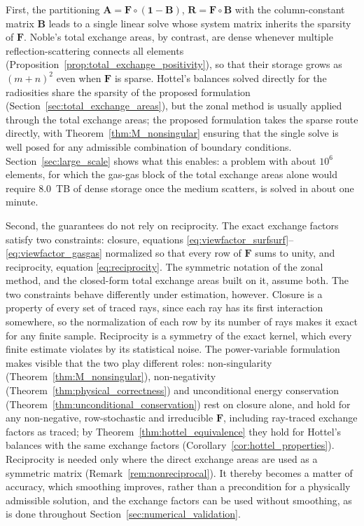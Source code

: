 \documentclass[preprint,1p,times]{elsarticle}
\theoremstyle{plain}
\theoremstyle{definition}
\theoremstyle{remark}
\begin{document}
First, the partitioning $\mathbf{A} = \mathbf{F}\circ(\mathbf{1}-\mathbf{B})$, $\mathbf{R} = \mathbf{F}\circ\mathbf{B}$ with the column-constant matrix $\mathbf{B}$ leads to a single linear solve whose system matrix inherits the sparsity of $\mathbf{F}$. Noble's total exchange areas, by contrast, are dense whenever multiple reflection-scattering connects all elements (Proposition~\ref{prop:total_exchange_positivity}), so that their storage grows as $(m+n)^2$ even when $\mathbf{F}$ is sparse. Hottel's balances solved directly for the radiosities share the sparsity of the proposed formulation (Section~\ref{sec:total_exchange_areas}), but the zonal method is usually applied through the total exchange areas; the proposed formulation takes the sparse route directly, with Theorem~\ref{thm:M_nonsingular} ensuring that the single solve is well posed for any admissible combination of boundary conditions. Section~\ref{sec:large_scale} shows what this enables: a problem with about $10^6$ elements, for which the gas-gas block of the total exchange areas alone would require 8.0~TB of dense storage once the medium scatters, is solved in about one minute.

Second, the guarantees do not rely on reciprocity. The exact exchange factors satisfy two constraints: closure, equations \eqref{eq:viewfactor_surfsurf}--\eqref{eq:viewfactor_gasgas} normalized so that every row of $\mathbf{F}$ sums to unity, and reciprocity, equation \eqref{eq:reciprocity}. The symmetric notation of the zonal method, and the closed-form total exchange areas built on it, assume both. The two constraints behave differently under estimation, however. Closure is a property of every set of traced rays, since each ray has its first interaction somewhere, so the normalization of each row by its number of rays makes it exact for any finite sample. Reciprocity is a symmetry of the exact kernel, which every finite estimate violates by its statistical noise. The power-variable formulation makes visible that the two play different roles: non-singularity (Theorem~\ref{thm:M_nonsingular}), non-negativity (Theorem~\ref{thm:physical_correctness}) and unconditional energy conservation (Theorem~\ref{thm:unconditional_conservation}) rest on closure alone, and hold for any non-negative, row-stochastic and irreducible $\mathbf{F}$, including ray-traced exchange factors as traced; by Theorem~\ref{thm:hottel_equivalence} they hold for Hottel's balances with the same exchange factors (Corollary~\ref{cor:hottel_properties}). Reciprocity is needed only where the direct exchange areas are used as a symmetric matrix (Remark~\ref{rem:nonreciprocal}). It thereby becomes a matter of accuracy, which smoothing improves, rather than a precondition for a physically admissible solution, and the exchange factors can be used without smoothing, as is done throughout Section~\ref{sec:numerical_validation}.
\end{document}
